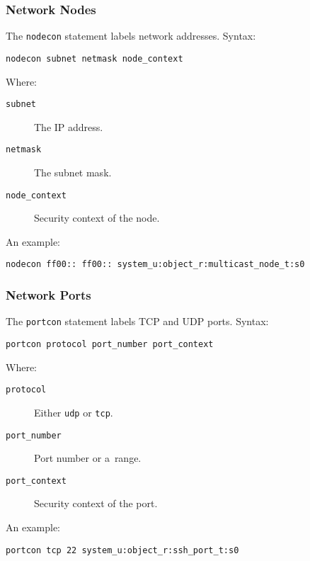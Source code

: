 \subsubsection{Network Nodes}
The \texttt{nodecon} statement labels network addresses. Syntax:
\begin{lstlisting}[language=te]
nodecon subnet netmask node_context
\end{lstlisting}
Where:
\begin{description}
    \item [\texttt{subnet}] The IP address.
    \item [\texttt{netmask}] The subnet mask.
    \item [\texttt{node\_context}] Security context of the node.
\end{description}
An example:
\begin{lstlisting}[language=te]
nodecon ff00:: ff00:: system_u:object_r:multicast_node_t:s0
\end{lstlisting}

\subsubsection{Network Ports}
The \texttt{portcon} statement labels TCP and UDP ports. Syntax:
\begin{lstlisting}[language=te]
portcon protocol port_number port_context
\end{lstlisting}
Where:
\begin{description}
    \item [\texttt{protocol}] Either \texttt{udp} or \texttt{tcp}.
    \item [\texttt{port\_number}] Port number or a~range.
    \item [\texttt{port\_context}] Security context of the port.
\end{description}
An example:
\begin{lstlisting}[language=te]
portcon tcp 22 system_u:object_r:ssh_port_t:s0
\end{lstlisting}


